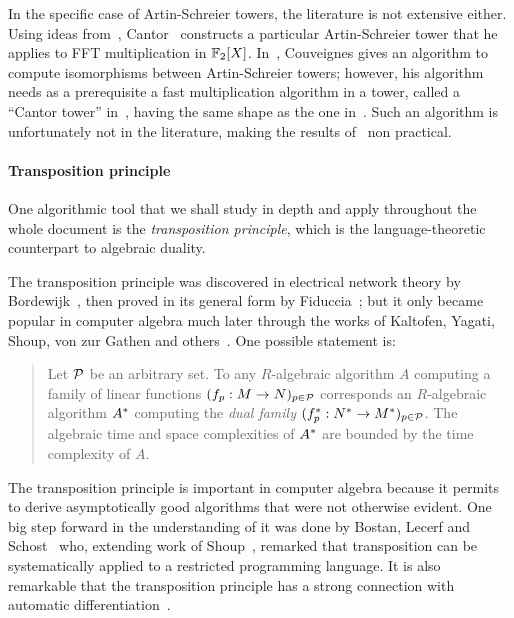 In the specific case of Artin-Schreier towers, the literature is not
extensive either.  Using ideas from~\cite{Conway:ONAG2000},
Cantor~\cite{cantor89} constructs a particular Artin-Schreier tower
that he applies to FFT multiplication in $\mathbb{F}_2[X]$.
In~\cite{couveignes00}, Couveignes gives an algorithm to compute
isomorphisms between Artin-Schreier towers; however, his algorithm
needs as a prerequisite a fast multiplication algorithm in a tower,
called a ``Cantor tower'' in~\cite{couveignes00}, having the same
shape as the one in~\cite{cantor89}. Such an algorithm is
unfortunately not in the literature, making the results
of~\cite{couveignes00} non practical.


\paragraph*{Transposition principle}
One algorithmic tool that we shall study in depth and apply throughout
the whole document is the \emph{transposition principle}, which is the
language-theoretic counterpart to algebraic duality.

The transposition principle was discovered in electrical network
theory by Bordewijk~\cite{bordewijk57}, then proved in its general
form by Fiduccia~\cite{fiduccia:phd}; but it only became popular in
computer algebra much later through the works of Kaltofen, Yagati,
Shoup, von zur Gathen and
others~\cite{kaltofen+lakshman89,vzgathen+shoup92,shoup94,shoup95,shoup99,hanrot+quercia+zimmermann}. One
possible statement is:
\begin{quote}
  Let $\mathcal{P}$ be an arbitrary set. To any $R$-algebraic algorithm
  $A$ computing a family of linear functions $(f_p:M\rightarrow
  N)_{p\in\mathcal{P}}$ corresponds an $R$-algebraic algorithm $A^\ast$
  computing the \emph{dual family}
  $(f^\ast_p:N^\ast\rightarrow M^\ast)_{p\in\mathcal{P}}$. The algebraic time
  and space complexities of $A^\ast$ are bounded by the time
  complexity of $A$.
\end{quote}

The transposition principle is important in computer algebra because
it permits to derive asymptotically good algorithms that were not
otherwise evident. One big step forward in the understanding of it was
done by Bostan, Lecerf and Schost~\cite{bostan+lecerf+schost:tellegen}
who, extending work of Shoup~\cite{shoup95}, remarked that
transposition can be systematically applied to a restricted
programming language. It is also remarkable that the transposition
principle has a strong connection with automatic
differentiation~\cite{baur+strassen83,kaltofen+lakshman89,Ka2K,gashkov+gashkov05,sergeev08}.

